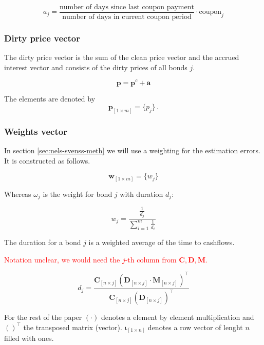\begin{equation}
    a_j= \frac{\mbox{number of days since last coupon payment}}{\mbox{number of days in current coupon period}}\cdot \mbox{coupon}_j
\end{equation}
 	

\subsubsection*{Dirty price vector}

The dirty price vector is the sum of the clean price vector and the accrued interest vector and consists of the dirty prices of all bonds $j$.

\begin{displaymath}
\bm{p}=\bm{p}^c+\bm{a}
\end{displaymath}

The elements are denoted by 
\begin{equation}\label{pd}
    \bm{p}_{\left[1\times m\right]}= \{p_j\}\,.
\end{equation}


\subsubsection*{Weights vector}

In section \ref{sec:nels-svenss-meth} we will use a weighting for the estimation errors. It is constructed  as follows.

\begin{equation}\label{weights}
    \bm{w}_{\left[1\times m\right]}= \{w_j\}
\end{equation}

Whereas $\omega_j$ is the weight for bond $j$ with duration $d_j$:

\begin{displaymath}
    w_j=\frac{\frac{1}{d_j}}{\sum_{i=1}^m\frac{1}{d_i}}
\end{displaymath}


The duration for a bond $j$ is a weighted average of the time to cashflows.

\textcolor{red}{Notation unclear, we would need the $j$-th column from $\bm{C,D,M}$.}

\begin{equation}\label{duration}
d_j= \frac{\bm{C}_{\left[n \times j\right]} \left(\bm{D}_{\left[n\times j\right]} \cdot \bm{M}_{\left[n\times j\right]}\right)^{\top}} {\bm{C}_{\left[n \times j\right]}\left(\bm{D}_{\left[n\times j\right]}\right)^{\top}}
\end{equation}



For the rest of the paper $(\cdot)$ denotes a element by element multiplication and $( )^{\top}$ the transposed matrix (vector). $\bm{\iota}_{\left[1\times n\right]}$ denotes a row vector of lenght $n$ filled with ones.


